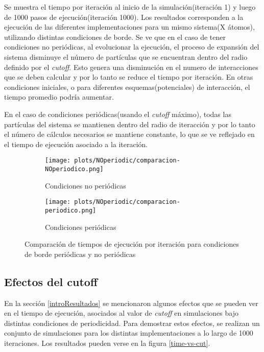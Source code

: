 Se muestra el tiempo por iteración al inicio de la simulación(iteración 1) y luego de 1000 pasos de ejecución(iteración 1000).
Los resultados corresponden a la ejecución de las diferentes implementaciones para un mismo sistema(X átomos), utilizando distintas condiciones de borde. 
Se ve que en el caso de tener condiciones no periódicas, al evolucionar la ejecución, el proceso de expansión del sistema disminuye el número de partículas que se encuentran dentro del radio definido por el \textit{cutoff}.
Esto genera una disminución en el numero de interacciones que se deben calcular y por lo tanto se reduce el tiempo por iteración. 
En otras condiciones iniciales, o para diferentes esquemas(potenciales) de interacción, el tiempo promedio podría aumentar.

En el caso de condiciones periódicas(usando el \textit{cutoff} máximo), 
todas las partículas del sistema se mantienen dentro del radio de iteracción y por lo tanto el número de cálculos necesarios se mantiene constante, lo que se ve reflejado en el tiempo de ejecución asociado a la iteración.

\begin{figure}[htbp]
\centering
\begin{subfigure}[b]{\plotwidthtres}
   \texttt{[image: plots/NOperiodic/comparacion-NOperiodico.png]}
   \caption{Condiciones no periódicas}
   \label{compar-1iter-promedio}
 \end{subfigure}
\begin{subfigure}[b]{\plotwidthtres}
   \texttt{[image: plots/NOperiodic/comparacion-periodico.png]}
   \caption{Condiciones periódicas}
   \label{compar-niter-promedio}
 \end{subfigure}
 \caption{Comparaci\'on de tiempos de ejecuci\'on por iteración para condiciones de borde periódicas y no periódicas}
 \label{periodic-effects}
\end{figure}




\subsection{Efectos del cutoff}
En la sección \ref{introResultados} se mencionaron algunos efectos que se pueden ver en el tiempo de ejecución, asociados al valor de \textit{cutoff} en simulaciones bajo distintas condiciones de periodicidad. 
Para demostrar estos efectos, se realizan un conjunto de simulaciones para los distintas implementaciones a lo largo de 1000 iteraciones.
Los resultados pueden verse en la figura \ref{time-vs-cut}. 

